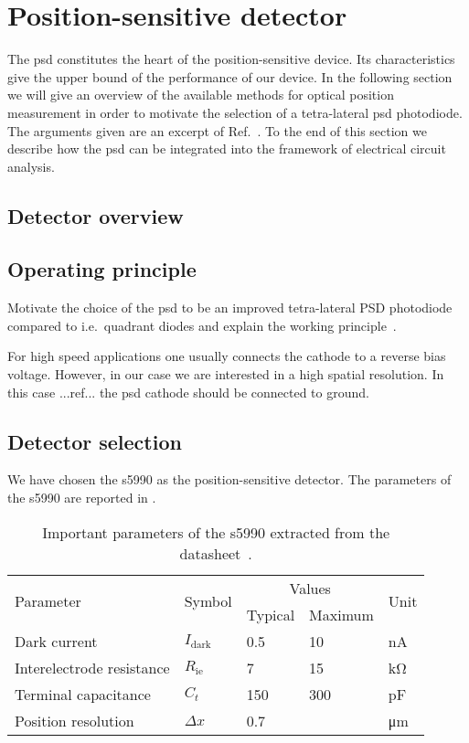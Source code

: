 \section{Position-sensitive detector}

The \gls{psd} constitutes the heart of the position-sensitive device.
Its characteristics give the upper bound of the performance of our device.
In the following section we will give an overview of the available methods for optical position measurement in order to motivate the selection of a tetra-lateral \gls{psd} photodiode.
The arguments given are an excerpt of Ref.~\cite{Noorlag74}.
To the end of this section we describe how the \gls{psd} can be integrated into the framework of electrical circuit analysis.

\subsection{Detector overview}



\subsection{Operating principle}

Motivate the choice of the \gls{psd} to be an improved tetra-lateral PSD photodiode compared to i.e.\ quadrant diodes and explain the working principle~\cite{Noorlag74}.

For high speed applications one usually connects the cathode to a reverse bias voltage.
However, in our case we are interested in a high spatial resolution. In this case ...ref... the \gls{psd} cathode should be connected to ground.

\subsection{Detector selection}

We have chosen the \gls{s5990} as the position-sensitive detector.
The parameters of the \gls{s5990} are reported in .
\begin{table}[H]
	\centering
	\begin{tabular}{lllll}
		\toprule
			\multirow{2}[3]{*}{Parameter} &
			\multirow{2}[3]{*}{Symbol} &
			\multicolumn{2}{c}{Values} &
			\multirow{2}[3]{*}{Unit} \\
			\cmidrule(lr){3-4} & & Typical & Maximum & \\
		\midrule
		Dark current & $I_\text{dark}$ & \num{0.5} & \num{10} & \si{\nano\ampere}\\
		Interelectrode resistance & $R_\text{ie}$ & \num{7} & \num{15} & \si{\kilo\ohm}\\
		Terminal capacitance & $C_t$ & \num{150} & \num{300} & \si{\pico\farad}\\
		Position resolution & $\Delta x$ & \num{0.7} & & \si{\micro\meter}\\
		\bottomrule	
	\end{tabular}
	\caption{Important parameters of the \gls{s5990} extracted from the datasheet~\cite{HamamatsuPSD}.}\label{tab:s5990}
\end{table}

